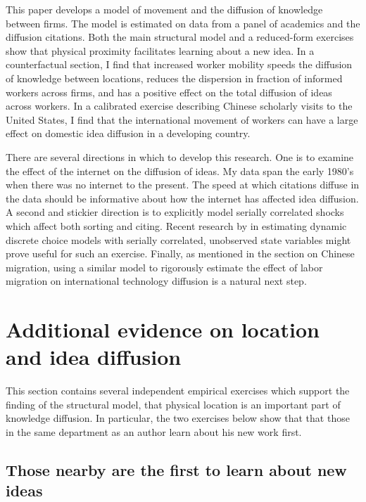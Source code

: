 \documentclass[]{article}
\begin{document}
This paper develops a model of movement and the diffusion of knowledge
between firms. The model is estimated on data from a panel of academics
and the diffusion citations. Both the main structural model and
a reduced-form exercises show that physical proximity facilitates learning
 about a new idea. In a counterfactual section, I find that increased worker mobility
 speeds the diffusion of knowledge between locations, reduces 
the dispersion in fraction of informed workers across firms, and has a
positive effect on the total diffusion of ideas across workers.
In a calibrated exercise describing Chinese scholarly visits to the United
States, I find that the international movement of workers can have a large 
effect on domestic idea diffusion in a developing country.

There are several directions in which to develop this research.  One is to examine the effect of the internet on the diffusion of ideas.  My data span the early 1980's when there was no internet to the present.  The speed at which citations diffuse in the data should be informative about how the internet has affected idea diffusion.  A second and stickier direction is to explicitly model serially correlated shocks which affect both sorting and citing.  Recent research by \citet{arcidiacono2011conditional} in estimating dynamic discrete choice models with serially correlated, unobserved state variables might prove useful for such an exercise.  Finally, as mentioned in the section on Chinese migration, using a similar model to rigorously estimate the effect of labor migration on international technology diffusion is a natural next step.

\newpage

\appendix
\appendixpage
\section{Additional evidence on location and idea diffusion}
\label{sec:add_evid}

This section contains several independent empirical exercises which
support the finding of the structural model, that physical location is
an important part of knowledge diffusion. In particular, the two
exercises below show that that those in the same department as an author
learn about his new work first.

\subsection{Those nearby are the first to learn about new ideas}
\end{document}
